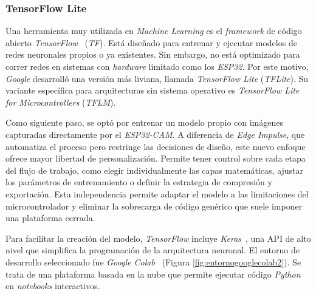 
\subsubsection{TensorFlow Lite}

Una herramienta muy utilizada en \emph{Machine Learning} es el \emph{framework} de código abierto \emph{TensorFlow}~\cite{tensorflow} (\emph{TF}). Está diseñado para entrenar y ejecutar modelos de redes neuronales propios o ya existentes. Sin embargo, no está optimizado para correr redes en sistemas con \emph{hardware} limitado como los \emph{ESP32}. Por este motivo, \emph{Google} desarrolló una versión más liviana, llamada \emph{TensorFlow Lite} (\emph{TFLite}). Su variante específica para arquitecturas sin sistema operativo es \emph{TensorFlow Lite for Microcontrollers} (\emph{TFLM}).

Como siguiente paso, se optó por entrenar un modelo propio con imágenes capturadas directamente por el \emph{ESP32-CAM}. A diferencia de \emph{Edge Impulse}, que automatiza el proceso pero restringe las decisiones de diseño, este nuevo enfoque ofrece mayor libertad de personalización. Permite tener control sobre cada etapa del flujo de trabajo, como elegir individualmente las capas matemáticas, ajustar los parámetros de entrenamiento o definir la estrategia de compresión y exportación. Esta independencia permite adaptar el modelo a las limitaciones del microcontrolador y eliminar la sobrecarga de código genérico que suele imponer una plataforma cerrada.


Para facilitar la creación del modelo, \emph{TensorFlow} incluye \emph{Keras}~\cite{keras}, una API de alto nivel que simplifica la programación de la arquitectura neuronal. El entorno de desarrollo seleccionado fue \emph{Google Colab}~\cite{colab} (Figura \ref{fig:entornogooglecolab2}). Se trata de una plataforma basada en la nube que permite ejecutar código \emph{Python} en \emph{notebooks} interactivos.



